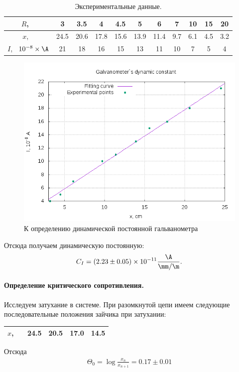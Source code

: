 \documentclass{../lab_class}
\begin{document}
\begin{table}[H]
	\centering
	\begin{tabular}{|c|c|c|c|c|c|c|c|c|c|c|}
																							  			  \hline
		$R$, \ \sk\Ohm 				& 3    & 3.5  & 4    & 4.5  & 5    & 6    & 7   & 10  & 15  & 20  \\ \hline
		$x$, \ \cm     				& 24.5 & 20.6 & 17.8 & 15.6 & 13.9 & 11.4 & 9.7 & 6.1 & 4.5 & 3.2  \\ \hline
		$I$, \ $10^{-8} \times \A$ & 21 & 18 & 16 & 15 & 13 & 11 & 10 & 7 & 5 & 4						  \\ \hline
	\end{tabular}
	\caption{Экспериментальные данные.}
\end{table}

\begin{figure}[H]
	\centering
	\includegraphics[width = 0.87 \textwidth]{dynamic_constant.png}
	\caption{К определению динамической постоянной гальванометра}
\end{figure}

Отсюда получаем динамическую постоянную:
\begin{gather*}
	C_I = (2.23 \pm 0.05) \times 10^{-11} \frac{\A}{\mm / \m}.
\end{gather*}

\paragraph{Определение критического сопротивления.}
Исследуем затухание в системе. При разомкнутой цепи имеем следующие последовательные положения зайчика при затухании:
\begin{table}[H]
	\centering
	\begin{tabular}{|c|c|c|c|c|}
		\hline
		$x$, \ \cm & 24.5 & 20.5 & 17.0 & 14.5 \\ \hline
	\end{tabular}
\end{table}
Отсюда 
\begin{gather*}
	\Theta_0 = \log{ \frac{x_n}{x_{n+1}} } = 0.17 \pm 0.01
\end{gather*}
\end{document}

